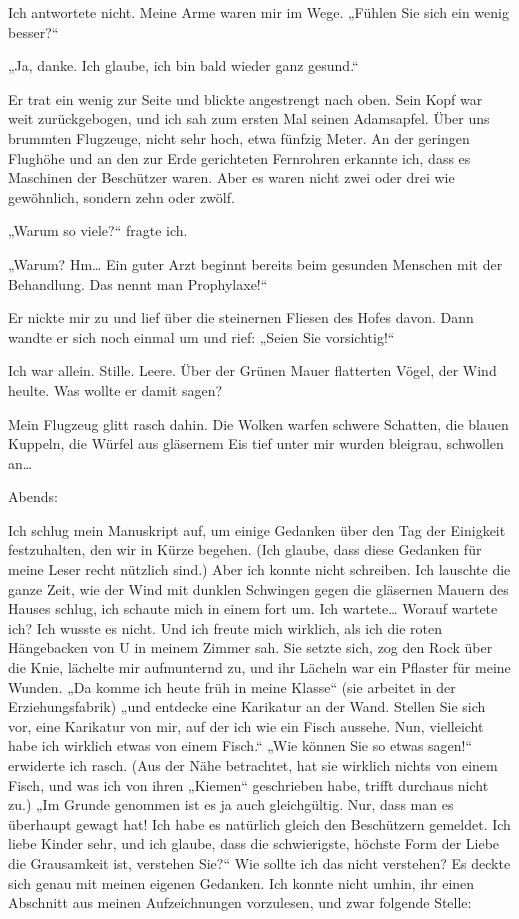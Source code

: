 Ich antwortete nicht. Meine Arme waren mir im Wege. „Fühlen Sie
sich ein wenig besser?“

„Ja, danke. Ich glaube, ich bin bald wieder ganz gesund.“

Er trat ein wenig zur Seite und blickte angestrengt nach oben. Sein
Kopf war weit zurückgebogen, und ich sah zum ersten Mal seinen
Adamsapfel. Über uns brummten Flugzeuge, nicht sehr hoch, etwa
fünfzig Meter. An der geringen Flughöhe und an den zur Erde
gerichteten Fernrohren erkannte ich, dass es Maschinen der
Beschützer waren. Aber es waren nicht zwei oder drei wie
gewöhnlich, sondern zehn oder zwölf.

„Warum so viele?“ fragte ich.

„Warum? Hm\ldots{} Ein guter Arzt beginnt bereits beim gesunden Menschen
mit der Behandlung. Das nennt
man Prophylaxe!“

Er nickte mir zu und lief über die steinernen Fliesen des Hofes
davon. Dann wandte er sich noch einmal um
und rief: „Seien Sie vorsichtig!“

Ich war allein. Stille. Leere. Über der Grünen Mauer flatterten
Vögel, der Wind heulte. Was wollte er damit sagen?

Mein Flugzeug glitt rasch dahin. Die Wolken warfen schwere
Schatten, die blauen Kuppeln, die Würfel aus
gläsernem Eis tief unter mir wurden bleigrau, schwollen an\ldots{}

Abends:

Ich schlug mein Manuskript auf, um einige Gedanken über den Tag der
Einigkeit festzuhalten, den wir in Kürze begehen. (Ich glaube, dass
diese Gedanken für meine Leser recht nützlich sind.) Aber ich
konnte nicht schreiben. Ich lauschte die ganze Zeit, wie der Wind
mit dunklen Schwingen gegen die gläsernen Mauern des Hauses schlug,
ich schaute mich in einem fort um. Ich wartete\ldots{} Worauf wartete
ich? Ich wusste es nicht. Und ich freute mich wirklich, als ich die
roten Hängebacken von U in meinem Zimmer sah. Sie setzte sich, zog
den Rock über die Knie, lächelte mir aufmunternd zu, und ihr
Lächeln war ein Pflaster für meine Wunden. „Da komme ich heute früh
in meine Klasse“ (sie arbeitet
in der Erziehungsfabrik) „und entdecke eine Karikatur an der Wand.
Stellen Sie sich vor, eine Karikatur von mir, auf der ich wie ein
Fisch aussehe. Nun, vielleicht habe ich wirklich etwas von einem
Fisch.“ „Wie können Sie so etwas sagen!“ erwiderte ich rasch. (Aus
der Nähe betrachtet, hat sie wirklich nichts von einem Fisch, und
was ich von ihren „Kiemen“ geschrieben habe, trifft durchaus nicht
zu.) „Im Grunde genommen ist es ja auch gleichgültig. Nur, dass man
es überhaupt gewagt hat! Ich habe es natürlich gleich den
Beschützern gemeldet. Ich liebe Kinder sehr, und ich glaube, dass
die schwierigste, höchste Form der Liebe die Grausamkeit ist,
verstehen Sie?“ Wie sollte ich das nicht verstehen? Es deckte sich
genau mit meinen eigenen Gedanken. Ich konnte nicht umhin, ihr
einen Abschnitt aus meinen Aufzeichnungen vorzulesen, und zwar
folgende Stelle:

